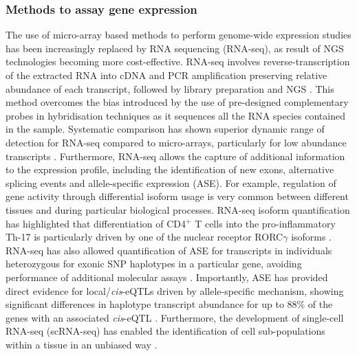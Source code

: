 \subsubsection{Methods to assay gene expression}
The use of micro-array based methods to perform genome-wide expression studies has been increasingly replaced by RNA sequencing (RNA-seq), as result of NGS technologies becoming more cost-effective. RNA-seq involves reverse-transcription of the extracted RNA into cDNA and PCR amplification preserving relative abundance of each transcript, followed by library preparation and NGS \parencite{Mortazavi2008}. This method overcomes the bias introduced by the use of pre-designed complementary probes in hybridisation techniques as it sequences all the RNA species contained in the sample. Systematic comparison has shown superior dynamic range of detection for RNA-seq compared to micro-arrays, particularly for low abundance transcripts \parencite{Zhao2014}. Furthermore, RNA-seq allows the capture of additional information to the expression profile, including the identification of new exons, alternative splicing events and allele-specific expression (ASE). For example, regulation of gene activity through differential isoform usage is very common between different tissues and during particular biological processes. RNA-seq isoform quantification has highlighted that differentiation of CD4$^+$ T cells into the pro-inflammatory Th-17 is particularly driven by one of the nuclear receptor RORC$\gamma$ isoforms \parencite{Zhao2014}. %
RNA-seq has also allowed quantification of ASE for transcripts in individuals heterozygous for exonic SNP haplotypes in a particular gene, avoiding performance of additional molecular assays \parencite{Yan2002}. Importantly, ASE has provided direct evidence for local/\textit{cis}-eQTLs driven by allele-specific mechanism, showing significant differences in haplotype transcript abundance for up to 88\% of the genes with an associated \textit{cis}-eQTL \parencite{Pickrell2010}. Furthermore, the development of single-cell RNA-seq (scRNA-seq) has enabled the identification of cell sub-populations within a tissue in an unbiased way \parencite{Tang2009, Tang2010}. 


